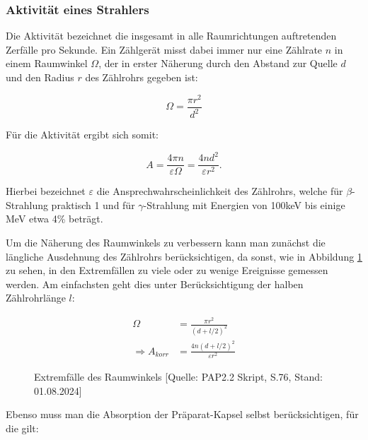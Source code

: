 \documentclass{article}
\begin{document}
\subsubsection{Aktivität eines Strahlers}

Die Aktivität bezeichnet die insgesamt in alle Raumrichtungen auftretenden Zerfälle pro Sekunde. Ein Zählgerät misst dabei immer nur eine Zählrate $n$ in einem Raumwinkel $\Omega$, der in erster Näherung durch den Abstand zur Quelle $d$ und den Radius $r$ des Zählrohrs gegeben ist:

\begin{equation}
    \Omega = \frac{\pi r^2}{d^2}
    \label{eq:Raumwinkel-ohneKorr}
\end{equation}

Für die Aktivität ergibt sich somit:

\begin{equation}
    A = \frac{4 \pi n}{\varepsilon \Omega} = \frac{4nd^2}{\varepsilon r^2}.
    \label{eq:Aktivität-ohneKorr}
\end{equation}

Hierbei bezeichnet $\varepsilon$ die Ansprechwahrscheinlichkeit des Zählrohrs, welche für $\beta$-Strahlung praktisch 1 und für $\gamma$-Strahlung mit Energien von 100keV bis einige MeV etwa 4\% beträgt.

Um die Näherung des Raumwinkels zu verbessern kann man zunächst die längliche Ausdehnung des Zählrohrs berücksichtigen, da sonst, wie in Abbildung \ref{fig:Extremfälle} zu sehen, in den Extremfällen zu viele oder zu wenige Ereignisse gemessen werden. Am einfachsten geht dies unter Berücksichtigung der halben Zählrohrlänge $l$:

\begin{equation}
    \begin{split}
        \Omega &= \frac{\pi r^2}{(d+ l/2)^2} \\
        \Rightarrow A_{korr} &= \frac{4n (d + l/2)^2}{\varepsilon r^2} 
    \end{split}
    \label{eq:Längenkorrektur}
\end{equation}


\begin{figure}[!h]
    \centering
    \caption{Extremfälle des Raumwinkels [Quelle: PAP2.2 Skript, S.76, Stand: 01.08.2024]}
    \label{fig:Extremfälle}
\end{figure}

Ebenso muss man die Absorption der Präparat-Kapsel selbst berücksichtigen, für die gilt:
\end{document}
